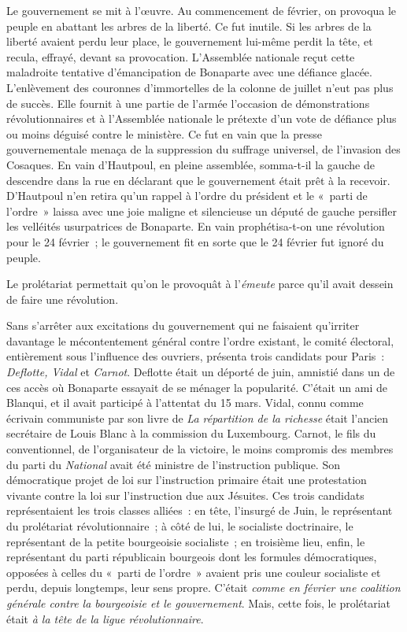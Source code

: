 \documentclass[twoside]{book} %
\begin{document}
Le gouvernement se mit à l’œuvre. Au commencement de février, on provoqua le peuple en abattant les arbres de la liberté. Ce fut inutile. Si les arbres de la liberté avaient perdu leur place, le gouvernement lui-même perdit la tête, et recula, effrayé, devant sa provocation. L’Assemblée nationale reçut cette maladroite tentative d’émancipation de Bonaparte avec une défiance glacée. L’enlèvement des couronnes d’immortelles de la colonne de juillet n’eut pas plus de succès. Elle fournit à une partie de l’armée l’occasion de démonstrations révolutionnaires et à l’Assemblée nationale le prétexte d’un vote de défiance plus ou moins déguisé contre le ministère. Ce fut en vain que la presse gouvernementale menaça de la suppression du suffrage universel, de l’invasion des Cosaques. En vain d’Hautpoul, en pleine assemblée, somma-t-il la gauche de descendre dans la rue en déclarant que le gouvernement était prêt à la recevoir. D’Hautpoul n’en retira qu’un rappel à l’ordre du président et le « parti de l’ordre » laissa avec une joie maligne et silencieuse un député de gauche persifler les velléités usurpatrices de Bonaparte. En vain prophétisa-t-on une révolution pour le 24 février ; le gouvernement fit en sorte que le 24 février fut ignoré du peuple.\par
Le prolétariat permettait qu’on le provoquât à l’\emph{émeute} parce qu’il avait dessein de faire une révolution.\par
Sans s’arrêter aux excitations du gouvernement qui ne faisaient qu’irriter davantage le mécontentement général contre l’ordre existant, le comité électoral, entièrement sous l’influence des ouvriers, présenta trois candidats pour Paris : \emph{Deflotte, Vidal} et \emph{Carnot}. Deflotte était un déporté de juin, amnistié dans un de ces accès où Bonaparte essayait de se ménager la popularité. C’était un ami de Blanqui, et il avait participé à l’attentat du 15 mars. Vidal, connu comme écrivain communiste par son livre de \emph{La répartition de la richesse} était l’ancien secrétaire de Louis Blanc à la commission du Luxembourg. Carnot, le fils du conventionnel, de l’organisateur de la victoire, le moins compromis des membres du parti du \emph{National} avait été ministre de l’instruction publique. Son démocratique projet de loi sur l’instruction primaire était une protestation vivante contre la loi sur l’instruction due aux Jésuites. Ces trois candidats représentaient les trois classes alliées : en tête, l’insurgé de Juin, le représentant du prolétariat révolutionnaire ; à côté de lui, le socialiste doctrinaire, le représentant de la petite bourgeoisie socialiste ; en troisième lieu, enfin, le représentant du parti républicain bourgeois dont les formules démocratiques, opposées à celles du « parti de l’ordre » avaient pris une couleur socialiste et perdu, depuis longtemps, leur sens propre. C’était \emph{comme en février une coalition générale contre la bourgeoisie et le gouvernement}. Mais, cette fois, le prolétariat était \emph{à la tête de la ligue révolutionnaire}.\par
\end{document}
